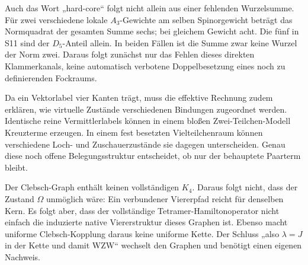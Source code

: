Auch das Wort „hard-core“ folgt nicht allein aus einer fehlenden Wurzelsumme. Für zwei verschiedene lokale $A_3$-Gewichte am selben Spinorgewicht beträgt das Normquadrat der gesamten Summe sechs; bei gleichem Gewicht acht. Die fünf in S11 sind der $D_5$-Anteil allein. In beiden Fällen ist die Summe zwar keine Wurzel der Norm zwei. Daraus folgt zunächst nur das Fehlen dieses direkten Klammerkanals, keine automatisch verbotene Doppelbesetzung eines noch zu definierenden Fockraums.

Da ein Vektorlabel vier Kanten trägt, muss die effektive Rechnung zudem erklären, wie virtuelle Zustände verschiedenen Bindungen zugeordnet werden. Identische reine Vermittlerlabels können in einem bloßen Zwei-Teilchen-Modell Kreuzterme erzeugen. In einem fest besetzten Vielteilchenraum können verschiedene Loch- und Zuschauerzustände sie dagegen unterscheiden. Genau diese noch offene Belegungsstruktur entscheidet, ob nur der behauptete Paarterm bleibt.

Der Clebsch-Graph enthält keinen vollständigen $K_4$. Daraus folgt nicht, dass der Zustand $\Omega$ unmöglich wäre: Ein verbundener Viererpfad reicht für denselben Kern. Es folgt aber, dass der vollständige Tetramer-Hamiltonoperator nicht einfach die induzierte native Viererstruktur dieses Graphen ist. Ebenso macht uniforme Clebsch-Kopplung daraus keine uniforme Kette. Der Schluss „also $\lambda=J$ in der Kette und damit WZW“ wechselt den Graphen und benötigt einen eigenen Nachweis.

